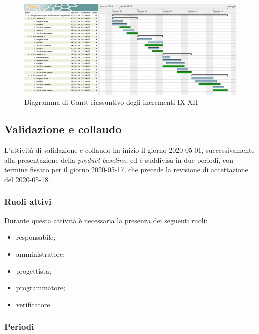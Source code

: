 		
		\begin{landscape}
			\begin{figure}[H]
				\centering
				\includegraphics[width=\linewidth]{images/gantt/incrementi-IX-XII} %
				\caption{Diagramma di Gantt riassuntivo degli incrementi IX-XII}
			\end{figure}		
		\end{landscape}


		\subsection{Validazione e collaudo}	
		
			L'attività di validazione e collaudo ha inizio il giorno 2020-05-01, successivamente alla presentazione della \textit{product baseline}, ed è suddivisa in due periodi, con termine fissato per il giorno 2020-05-17, che precede la revisione di accettazione del 2020-05-18.
			
			\subsubsection{Ruoli attivi}
			
			Durante questa attività è necessaria la presenza dei seguenti ruoli:
			\begin{itemize}
				\item responsabile;
				\item amministratore;
				\item progettista;
				\item programmatore;
				\item verificatore.
			\end{itemize}
			
			\subsubsection{Periodi}
			
